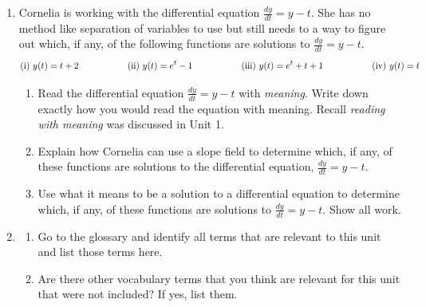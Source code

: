 \begin{enumerate}
\clearpage

\item Cornelia is working with the differential equation $\displaystyle\frac{dy}{dt}= y - t$.  She has no method like separation of variables to use but still needs to a way to figure out which, if any, of the following functions are solutions to $\displaystyle\frac{dy}{dt}= y - t$. \label{03HWproblem6}
\[
\text{(i) }y(t)= t + 2 \hspace{.75in} \text{(ii) }y(t)= e^t-1 \hspace{.75in} \text{(iii) }y(t) = e^t  + t + 1 \hspace{.75in} \text{(iv) }y(t) = t
\]
  
\begin{enumerate}
\item Read the differential equation $\displaystyle\frac{dy}{dt}= y - t$ with {\em meaning}. Write down exactly how you would read the equation with meaning. Recall {\em reading with meaning} was discussed in Unit 1.
\item	Explain how Cornelia can use a slope field to determine which, if any, of these functions are solutions to the differential equation, $\displaystyle\frac{dy}{dt}= y - t$. 
\item	Use what it means to be a solution to a differential equation to determine which, if any, of these functions are solutions to $\displaystyle\frac{dy}{dt}= y - t$.  Show all work.
\end{enumerate}

\item
\begin{enumerate}
\item Go to the glossary and identify all terms that are relevant to this unit and list those terms here.
\item Are there other vocabulary terms that you think are relevant for this unit that were not included? If yes, list them.
\end{enumerate}

\end{enumerate}

